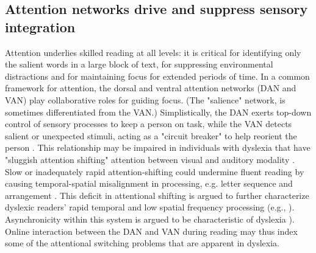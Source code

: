 \subsection{Attention networks drive and suppress sensory integration} 
Attention underlies skilled reading at all levels: it is critical for identifying only the salient words in a large block of text, for suppressing environmental distractions and for maintaining focus for extended periods of time. In a common framework for attention, the dorsal and ventral attention networks (DAN and VAN) play collaborative roles for guiding focus. (The "salience" network, is sometimes differentiated from the VAN.) Simplistically, the DAN exerts top-down control of sensory processes to keep a person on task, while the VAN detects salient or unexpected stimuli, acting as a "circuit breaker" to help reorient the person \cite{Corbetta2002, Vossel2014}. This relationship may be impaired in individuals with dyslexia that have "sluggish attention shifting" attention between visual and auditory modality \cite{Harrar2014}. Slow or inadequately rapid attention-shifting could undermine fluent reading by causing temporal-spatial misalignment in processing, e.g. letter sequence and arrangement \cite{Lallier2009}. This deficit in attentional shifting is argued to further characterize dyslexic readers’ rapid temporal and low spatial frequency processing (e.g., \cite{Ingelhem2001, Witton1998}). Asynchronicity within this system is argued to be characteristic of dyslexia \cite{Vidyasagar2009, Lallier2009, Ingelhem2001}). Online interaction between the DAN and VAN during reading may thus index some of the attentional switching problems that are apparent in dyslexia. 


